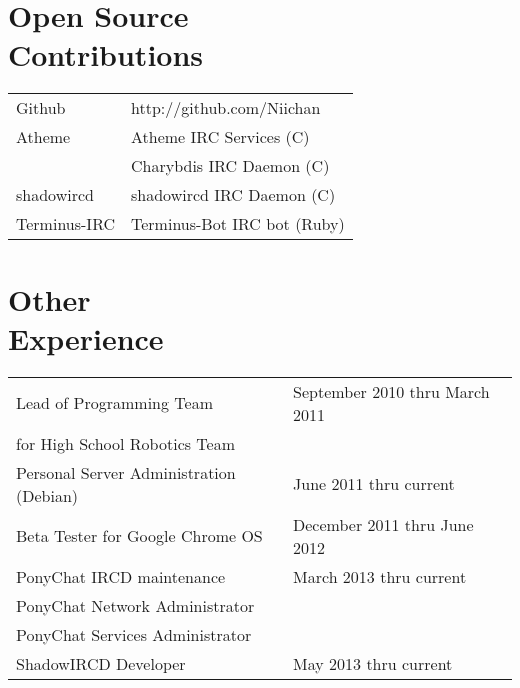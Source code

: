 \documentclass[line, margin, 10pt]{res}
\begin{document}
\begin{resume}
\section{Open Source \\ Contributions}
\begin{tabular}{l l}
Github & http://github.com/Niichan \\ [5pt]
Atheme & Atheme IRC Services (C) \\ [5pt]
& Charybdis IRC Daemon (C) \\ [5pt]
shadowircd & shadowircd IRC Daemon (C) \\ [5pt]
Terminus-IRC & Terminus-Bot IRC bot (Ruby) \\ [5pt]
\end{tabular}

\section{Other \\ Experience}
\begin{tabular}{l l}
 Lead of Programming Team & \hfill September 2010 thru March 2011 \\ [5pt]
 for High School Robotics Team & \\ [6pt]
 Personal Server Administration (Debian) & \hfill June 2011 thru current  \\ [6pt]
 Beta Tester for Google Chrome OS & \hfill December 2011 thru June 2012 \\ [6pt]
 PonyChat IRCD maintenance & \hfill March 2013 thru current \\ [5pt]
 PonyChat Network Administrator & \hfill \\ [5pt]
 PonyChat Services Administrator & \hfill \\ [6pt]
 ShadowIRCD Developer & \hfill May 2013 thru current \\ [5pt]
\end{tabular}
     
\end{resume}
\end{document}
